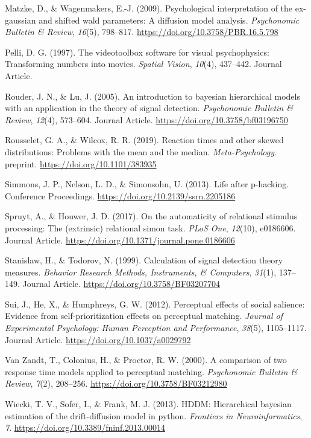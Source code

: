 \documentclass[
  english,
  man]{apa6}
\begin{document}
\leavevmode\hypertarget{ref-matzke_psychological_2009}{}%
Matzke, D., \& Wagenmakers, E.-J. (2009). Psychological interpretation of the ex-gaussian and shifted wald parameters: A diffusion model analysis. \emph{Psychonomic Bulletin \& Review}, \emph{16}(5), 798--817. \url{https://doi.org/10.3758/PBR.16.5.798}

\leavevmode\hypertarget{ref-Pelli_1997}{}%
Pelli, D. G. (1997). The videotoolbox software for visual psychophysics: Transforming numbers into movies. \emph{Spatial Vision}, \emph{10}(4), 437--442. Journal Article.

\leavevmode\hypertarget{ref-Rouder_2005_BHM_SDT}{}%
Rouder, J. N., \& Lu, J. (2005). An introduction to bayesian hierarchical models with an application in the theory of signal detection. \emph{Psychonomic Bulletin \& Review}, \emph{12}(4), 573--604. Journal Article. \url{https://doi.org/10.3758/bf03196750}

\leavevmode\hypertarget{ref-Rousselet_2019}{}%
Rousselet, G. A., \& Wilcox, R. R. (2019). Reaction times and other skewed distributions: Problems with the mean and the median. \emph{Meta-Psychology}. preprint. \url{https://doi.org/10.1101/383935}

\leavevmode\hypertarget{ref-Simmons_2013_life}{}%
Simmons, J. P., Nelson, L. D., \& Simonsohn, U. (2013). Life after p-hacking. Conference Proceedings. \url{https://doi.org/10.2139/ssrn.2205186}

\leavevmode\hypertarget{ref-Spruyt_de_Houwer_2017}{}%
Spruyt, A., \& Houwer, J. D. (2017). On the automaticity of relational stimulus processing: The (extrinsic) relational simon task. \emph{PLoS One}, \emph{12}(10), e0186606. Journal Article. \url{https://doi.org/10.1371/journal.pone.0186606}

\leavevmode\hypertarget{ref-Stanislaw_Todorov_1999}{}%
Stanislaw, H., \& Todorov, N. (1999). Calculation of signal detection theory measures. \emph{Behavior Research Methods, Instruments, \& Computers}, \emph{31}(1), 137--149. Journal Article. \url{https://doi.org/10.3758/BF03207704}

\leavevmode\hypertarget{ref-Sui_2012_JEPHPP}{}%
Sui, J., He, X., \& Humphreys, G. W. (2012). Perceptual effects of social salience: Evidence from self-prioritization effects on perceptual matching. \emph{Journal of Experimental Psychology: Human Perception and Performance}, \emph{38}(5), 1105--1117. Journal Article. \url{https://doi.org/10.1037/a0029792}

\leavevmode\hypertarget{ref-van_zandt_comparison_2000}{}%
Van Zandt, T., Colonius, H., \& Proctor, R. W. (2000). A comparison of two response time models applied to perceptual matching. \emph{Psychonomic Bulletin \& Review}, \emph{7}(2), 208--256. \url{https://doi.org/10.3758/BF03212980}

\leavevmode\hypertarget{ref-wiecki_hddm_2013}{}%
Wiecki, T. V., Sofer, I., \& Frank, M. J. (2013). HDDM: Hierarchical bayesian estimation of the drift-diffusion model in python. \emph{Frontiers in Neuroinformatics}, \emph{7}. \url{https://doi.org/10.3389/fninf.2013.00014}

\endgroup
\end{document}
